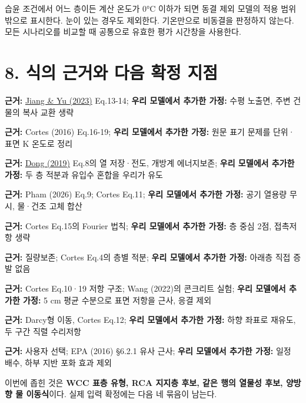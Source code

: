 \documentclass[11pt,a4paper]{article}
\begin{document}
습윤 조건에서 어느 층이든 계산 온도가 0°C 이하가 되면 동결 제외 모델의 적용 범위 밖으로 표시한다. 눈이 있는 경우도 제외한다. 기온만으로 비동결을 판정하지 않는다. 모든 시나리오를 비교할 때 공통으로 유효한 평가 시간창을 사용한다.

\section{8. 식의 근거와 다음 확정 지점}

\begin{description}[leftmargin=0pt,style=nextline]
\item[T1 단파·장파] \textbf{근거:} \href{\detokenize{https://doi.org/10.1186/s43065-023-00090-9}}{Jiang \& Yu (2023)} Eq.13-14; \textbf{우리 모델에서 추가한 가정:} 수평 노출면, 주변 건물의 복사 교환 생략
\item[T1 현열·잠열·전도] \textbf{근거:} Cortes (2016) Eq.16-19; \textbf{우리 모델에서 추가한 가정:} 원문 표기 문제를 단위·표면 K 온도로 정리
\item[T1-T2 저장·혼합] \textbf{근거:} \href{\detokenize{https://doi.org/10.3390/ma12162546}}{Dong (2019)} Eq.8의 열 저장·전도, 개방계 에너지보존; \textbf{우리 모델에서 추가한 가정:} 두 층 적분과 유입수 혼합을 우리가 유도
\item[T3 열용량] \textbf{근거:} Pham (2026) Eq.9; Cortes Eq.11; \textbf{우리 모델에서 추가한 가정:} 공기 열용량 무시, 물·건조 고체 합산
\item[T3 열저항] \textbf{근거:} Cortes Eq.15의 Fourier 법칙; \textbf{우리 모델에서 추가한 가정:} 층 중심 2점, 접촉저항 생략
\item[W1·W5] \textbf{근거:} 질량보존; Cortes Eq.4의 층별 적분; \textbf{우리 모델에서 추가한 가정:} 아래층 직접 증발 없음
\item[E1] \textbf{근거:} Cortes Eq.10·19 저항 구조; Wang (2022)의 콘크리트 실험; \textbf{우리 모델에서 추가한 가정:} 5 cm 평균 수분으로 표면 저항을 근사, 응결 제외
\item[W2-W3] \textbf{근거:} Darcy형 이동, Cortes Eq.12; \textbf{우리 모델에서 추가한 가정:} 하향 좌표로 재유도, 두 구간 직렬 수리저항
\item[W4] \textbf{근거:} 사용자 선택; EPA (2016) §6.2.1 유사 근사; \textbf{우리 모델에서 추가한 가정:} 일정 배수, 하부 지반 포화 효과 제외
\end{description}

이번에 좁힌 것은 \textbf{WCC 표층 유형, RCA 지지층 후보, 같은 행의 열물성 후보, 양방향 물 이동식}이다. 실제 입력 확정에는 다음 네 묶음이 남는다.
\end{document}
